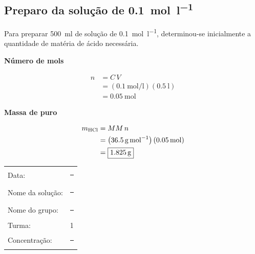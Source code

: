 \documentclass[a4paper,12pt]{article}
\newcommand{\subtitulo}[1]{%
  \par\medskip
  {\color{quadroazul}\bfseries\large #1}\par\smallskip
}
\begin{document}
\subsection{Preparo da solução de  \qty{0.1}{\mole\per\litre}}

Para preparar \qty{500}{\milli\litre} de solução de 
\qty{0.1}{\mole\per\litre}, determinou-se inicialmente a quantidade de matéria de ácido necessária.

\begin{minipage}[t]{0.48\textwidth}
\subtitulo{Número de mols}

\begin{align*}
  n &= C\,V \\
    &= \left(\qty{0.1}{\mole\per\litre}\right)
       \left(\qty{0.5}{\litre}\right) \\
    &= \boxed{\qty{0.05}{\mole}}
\end{align*}

\subtitulo{Massa de  puro}

\begin{align*}
  m_{\ce{HCl}} &= MM\,n \\
    &= \left(\qty{36.5}{\gram\per\mole}\right)
       \left(\qty{0.05}{\mole}\right) \\
    &= \boxed{\qty{1.825}{\gram}}
\end{align*}

\begin{tcolorbox}[
  title=Etiqueta da solução,
  colback=quadrocinza,
  colframe=black!65,
  boxrule=0.6pt,
  arc=1mm
]
\begin{tabular}{@{}ll@{}}
Data: & \rule{2.8cm}{0.4pt}\\[1.3ex]
Nome da solução: & \rule{2.2cm}{0.4pt}\\[1.3ex]
Nome do grupo: & \rule{2.5cm}{0.4pt}\\[1.3ex]
Turma: & 1\\[1.3ex]
Concentração: & \rule{2.8cm}{0.4pt}
\end{tabular}
\end{tcolorbox}
\end{minipage}
\hfill
\end{document}
